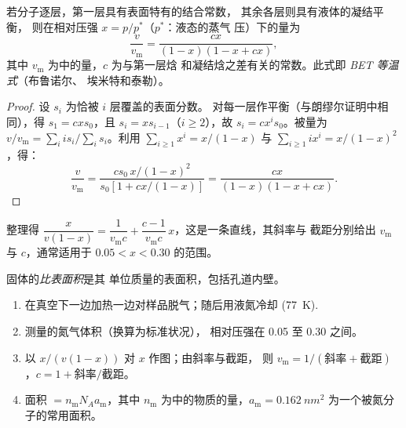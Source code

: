\begin{theorem}\label{thm:b3:surfaces-catalysis:bet}
若分子逐层，第一层具有表面特有的结合常数，
其余各层则具有液体的凝结平衡，
则在相对压强 $x = p/p^*$（$p^*$：液态的蒸气
压）下的量为
\[
  \frac{v}{v_{\mathrm m}} = \frac{cx}{(1 - x)(1 - x + cx)},
\]
其中 $v_{\mathrm m}$ 为中的量，$c$ 为与第一层焓
和凝结焓之差有关的常数。此式即
\emph{BET 等温式}（布鲁诺尔、
埃米特和泰勒）。
\end{theorem}

\begin{proof}
设 $s_i$ 为恰被 $i$ 层覆盖的表面分数。
对每一层作平衡（与朗缪尔证明中相同），得 $s_1 = cxs_0$，且 $s_i =
xs_{i-1}$（$i \ge 2$），故 $s_i = cx^is_0$。被量为 $v/v_{\mathrm m} =
\sum_iis_i/\sum_is_i$。利用 $\sum_{i\ge1}x^i = x/(1 - x)$ 与 $\sum_{i\ge1}ix^i = x/(1 - x)^2$，得：
\[
  \frac{v}{v_{\mathrm m}} = \frac{cs_0\,x/(1 - x)^2}{s_0[1 + cx/(1 - x)]} = \frac{cx}{(1 - x)(1 - x + cx)} .
\]
\end{proof}

整理得 $\dfrac{x}{v(1 - x)} = \dfrac{1}{v_{\mathrm m}c} + \dfrac{c - 1}{v_{\mathrm m}c}\,x$，这是一条直线，其斜率与
截距分别给出 $v_{\mathrm m}$ 与 $c$，通常适用于 $0.05 < x < 0.30$ 的范围。

\begin{definition}[比表面积]\label{def:b3:surfaces-catalysis:surface-area}
固体的\emph{比表面积}是其
单位质量的表面积，包括孔道内壁。
\end{definition}

\begin{method}[由氮气等温线测定比表面积]\label{met:b3:surfaces-catalysis:bet-area}
\begin{enumerate}
  \item 在真空下一边加热一边对样品脱气；随后用液氮冷却
        (\qty{77}{K}).
  \item 测量的氮气体积（换算为标准状况），
        相对压强在 0.05 至 0.30 之间。
  \item 以 $x/(v(1 - x))$ 对 $x$ 作图；由斜率与截距，
        则 $v_{\mathrm m} = 1/(\text{斜率} + \text{截距})$，$c = 1 + \text{斜率}/\text{截距}$。
  \item 面积 $= n_{\mathrm m}N_Aa_{\mathrm m}$，其中 $n_{\mathrm m}$ 为中的物质的量，$a_{\mathrm m} = \qty{0.162}{nm^2}$
        为一个被氮分子的常用面积。
\end{enumerate}
\end{method}

